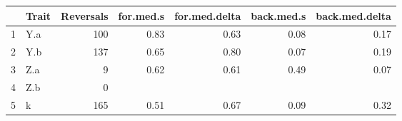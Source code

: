 \begin{table}[ht]
\begin{center}
\begin{tabular}{rlrrrrr}
  \hline
 & Trait & Reversals & for.med.s & for.med.delta & back.med.s & back.med.delta \\ 
  \hline
1 & Y.a & 100 & 0.83 & 0.63 & 0.08 & 0.17 \\ 
  2 & Y.b & 137 & 0.65 & 0.80 & 0.07 & 0.19 \\ 
  3 & Z.a &   9 & 0.62 & 0.61 & 0.49 & 0.07 \\ 
  4 & Z.b &   0 &  &  &  &  \\ 
  5 & k & 165 & 0.51 & 0.67 & 0.09 & 0.32 \\ 
   \hline
\end{tabular}
\end{center}
\end{table}
